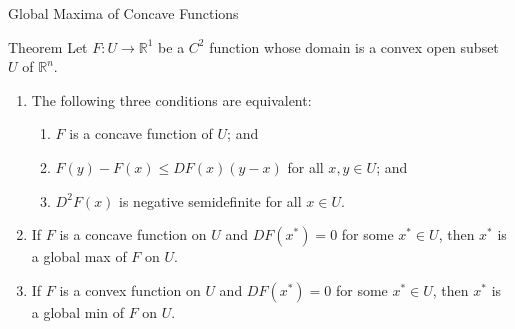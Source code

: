 \documentclass{beamer}
\begin{document}
\begin{frame}{Global Maxima of Concave Functions}
    \begin{block}{Theorem}
     Let  $F:U\to \mathbb{R}^1$ be a $C^2$ function whose domain is a convex open subset  $U$ of $\mathbb{R}^n$. 
     \begin{enumerate}
         \item The following three conditions are equivalent:
         \begin{enumerate}[i]
             \item $F$ is a concave function of $U$; and
             \item $F(y)-F(x)\leq DF(x)(y-x)$ for all $x, y\in U$; and 
             \item $D^2F(x)$ is negative semidefinite for all $x\in U$.
         \end{enumerate}
         \item If $F$ is a concave function on $U$ and $DF(x^*)=0$ for some $x^*\in U$, then $x^*$ is a global max of $F$ on $U$. 
         \item If $F$ is a convex function on $U$ and $DF(x^*)=0$ for some $x^*\in U$, then $x^*$ is a global min of $F$ on $U$.  
     \end{enumerate}
\end{block}
\end{frame}
\end{document}
